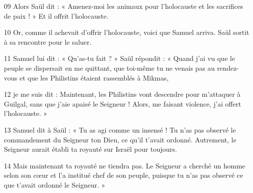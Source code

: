 
09 Alors Saül dit : « Amenez-moi les animaux pour l’holocauste et les sacrifices de paix ! » Et il offrit l’holocauste.

10 Or, comme il achevait d’offrir l’holocauste, voici que Samuel arriva. Saül sortit à sa rencontre pour le saluer.

11 Samuel lui dit : « Qu’as-tu fait ? » Saül répondit : « Quand j’ai vu que le peuple se dispersait en me quittant, que toi-même tu ne venais pas au rendez-vous et que les Philistins étaient rassemblés à Mikmas,

12 je me suis dit : Maintenant, les Philistins vont descendre pour m’attaquer à Guilgal, sans que j’aie apaisé le Seigneur ! Alors, me faisant violence, j’ai offert l’holocauste. »

13 Samuel dit à Saül : « Tu as agi comme un insensé ! Tu n’as pas observé le commandement du Seigneur ton Dieu, ce qu’il t’avait ordonné. Autrement, le Seigneur aurait établi ta royauté sur Israël pour toujours.

14 Mais maintenant ta royauté ne tiendra pas. Le Seigneur a cherché un homme selon son cœur et l’a institué chef de son peuple, puisque tu n’as pas observé ce que t’avait ordonné le Seigneur. »